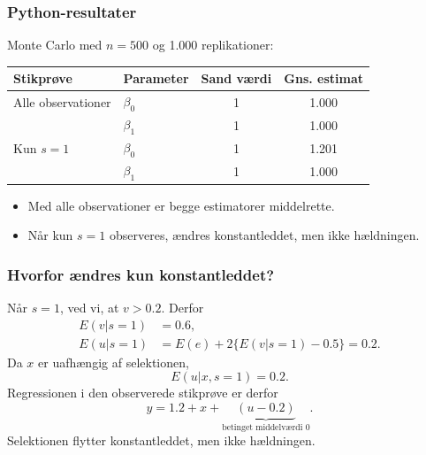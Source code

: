 \documentclass[aspectratio=43,t]{beamer}
\begin{document}
\begin{frame}
\frametitle{Python-resultater}

	Monte Carlo med $n=500$ og 1.000 replikationer:
	\begin{center}
	\begin{tabular}{llcc}
	\toprule
	Stikprøve & Parameter & Sand værdi & Gns. estimat \\
	\midrule
	Alle observationer & $\beta_0$ & 1 & 1.000 \\
	                  & $\beta_1$ & 1 & 1.000 \\
	\addlinespace
	Kun $s=1$         & $\beta_0$ & 1 & 1.201 \\
	                  & $\beta_1$ & 1 & 1.000 \\
	\bottomrule
	\end{tabular}
	\end{center}

	\begin{itemize}
		\item Med alle observationer er begge estimatorer middelrette.
		\item Når kun $s=1$ observeres, ændres konstantleddet, men ikke hældningen.
	\end{itemize}

\end{frame}

\begin{frame}
\frametitle{Hvorfor ændres kun konstantleddet?}

	Når $s=1$, ved vi, at $v>0.2$. Derfor
	\begin{align*}
	E(v|s=1)&=0.6,\\
	E(u|s=1)&=E(e)+2\{E(v|s=1)-0.5\}=0.2.
	\end{align*}
	Da $x$ er uafhængig af selektionen,
	\begin{equation*}
	E(u|x,s=1)=0.2.
	\end{equation*}
	Regressionen i den observerede stikprøve er derfor
	\begin{equation*}
	y=1.2+x+\underbrace{(u-0.2)}_{\text{betinget middelværdi }0}.
	\end{equation*}
	Selektionen flytter konstantleddet, men ikke hældningen.

\end{frame}

\end{document}
